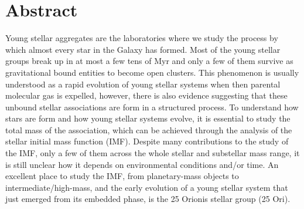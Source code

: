 \documentclass[12pt]{article}
\begin{document}
\section*{\centering Abstract}
Young stellar aggregates are the laboratories where we study the process by which almost every star in the Galaxy has formed. Most of the young stellar groups break up in at most a few tens of Myr and only a few of them survive as gravitational bound entities to become open clusters. This phenomenon is usually understood as a rapid evolution of young stellar systems when then parental molecular gas is expelled, however, there is also evidence suggesting that these unbound stellar associations are form in a structured process. To understand how stars are form and how young stellar systems evolve, it is essential to study the total mass of the association, which can be achieved through the analysis of the stellar initial mass function (IMF). Despite many contributions to the study of the IMF, only a few of them across the whole stellar and substellar mass range, it is still unclear how it depends on environmental conditions and/or time. An excellent place to study the IMF, from planetary-mass objects to intermediate/high-mass, and the early evolution of a young stellar system that just emerged from its embedded phase, is the 25 Orionis stellar group (25 Ori).
\end{document}
